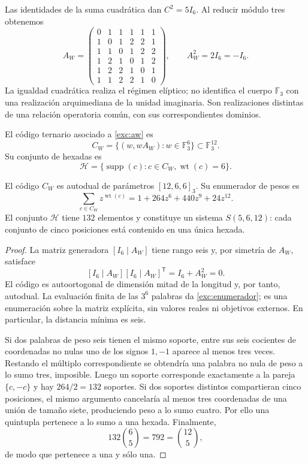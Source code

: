 Las identidades de la suma cuadrática dan $C^2=5I_6$. Al reducir módulo
tres obtenemos
\begin{equation}
 A_W=
 \begin{pmatrix}
 0&1&1&1&1&1\\
 1&0&1&2&2&1\\
 1&1&0&1&2&2\\
 1&2&1&0&1&2\\
 1&2&2&1&0&1\\
 1&1&2&2&1&0
 \end{pmatrix},
 \qquad A_W^2=2I_6=-I_6.
 \label{exc:aw}
\end{equation}
La igualdad cuadrática realiza el régimen elíptico; no identifica el
cuerpo $\mathbb F_3$ con una realización arquimediana de la unidad
imaginaria. Son realizaciones distintas de una relación operatoria
común, con sus correspondientes dominios.

\begin{definition}
\label{exc:codigo}
El código ternario asociado a \eqref{exc:aw} es
\[
 C_W=\{(w,wA_W):w\in\mathbb F_3^6\}
       \subset\mathbb F_3^{12}.
\]
Su conjunto de hexadas es
\[
 \mathcal H=
 \{\operatorname{supp}(c):c\in C_W,
                           \operatorname{wt}(c)=6\}.
\]
\end{definition}

\begin{proposition}
\label{exc:codigo-witt}
El código $C_W$ es autodual de parámetros $[12,6,6]_3$. Su enumerador
de pesos es
\begin{equation}
 \sum_{c\in C_W}z^{\operatorname{wt}(c)}
   =1+264z^6+440z^9+24z^{12}.
 \label{exc:enumerador}
\end{equation}
El conjunto $\mathcal H$ tiene $132$ elementos y constituye un sistema
$S(5,6,12)$: cada conjunto de cinco posiciones está contenido en una
única hexada.
\end{proposition}

\begin{proof}
La matriz generadora $[I_6\mid A_W]$ tiene rango seis y, por simetría
de $A_W$, satisface
\[
 [I_6\mid A_W][I_6\mid A_W]^{\mathsf T}
   =I_6+A_W^2=0.
\]
El código es autoortogonal de dimensión mitad de la longitud y, por
tanto, autodual. La evaluación finita de las $3^6$ palabras da
\eqref{exc:enumerador}; es una enumeración sobre la matriz explícita,
sin valores reales ni objetivos externos. En particular, la distancia
mínima es seis.

Si dos palabras de peso seis tienen el mismo soporte, entre sus seis
cocientes de coordenadas no nulas uno de los signos $1,-1$ aparece al
menos tres veces. Restando el múltiplo correspondiente se obtendría
una palabra no nula de peso a lo sumo tres, imposible. Luego un soporte
corresponde exactamente a la pareja $\{c,-c\}$ y hay $264/2=132$
soportes. Si dos soportes distintos compartieran cinco posiciones,
el mismo argumento cancelaría al menos tres coordenadas de una unión
de tamaño siete, produciendo peso a lo sumo cuatro. Por ello una
quintupla pertenece a lo sumo a una hexada. Finalmente,
\[
 132\binom65=792=\binom{12}5,
\]
de modo que pertenece a una y sólo una.
\end{proof}

